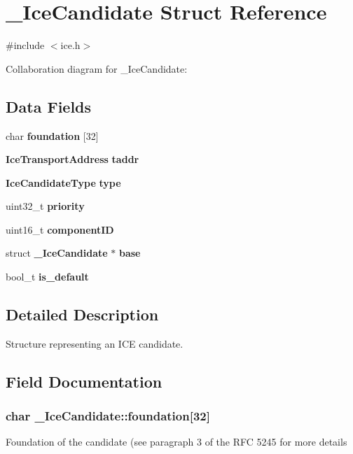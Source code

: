 \section{\-\_\-\-Ice\-Candidate Struct Reference}
\label{struct__IceCandidate}


{\ttfamily \#include $<$ice.\-h$>$}



Collaboration diagram for \-\_\-\-Ice\-Candidate\-:
\subsection*{Data Fields}
\begin{DoxyCompactItemize}
\item 
char {\bf foundation} [32]
\item 
{\bf Ice\-Transport\-Address} {\bf taddr}
\item 
{\bf Ice\-Candidate\-Type} {\bf type}
\item 
uint32\-\_\-t {\bf priority}
\item 
uint16\-\_\-t {\bf component\-I\-D}
\item 
struct {\bf \-\_\-\-Ice\-Candidate} $\ast$ {\bf base}
\item 
bool\-\_\-t {\bf is\-\_\-default}
\end{DoxyCompactItemize}


\subsection{Detailed Description}
Structure representing an I\-C\-E candidate. 

\subsection{Field Documentation}
\subsubsection[{foundation}]{\setlength{\rightskip}{0pt plus 5cm}char \-\_\-\-Ice\-Candidate\-::foundation[32]}\label{struct__IceCandidate_a9a0efb52ab0c3af220d49caf61e28162}
Foundation of the candidate (see paragraph 3 of the R\-F\-C 5245 for more details 
